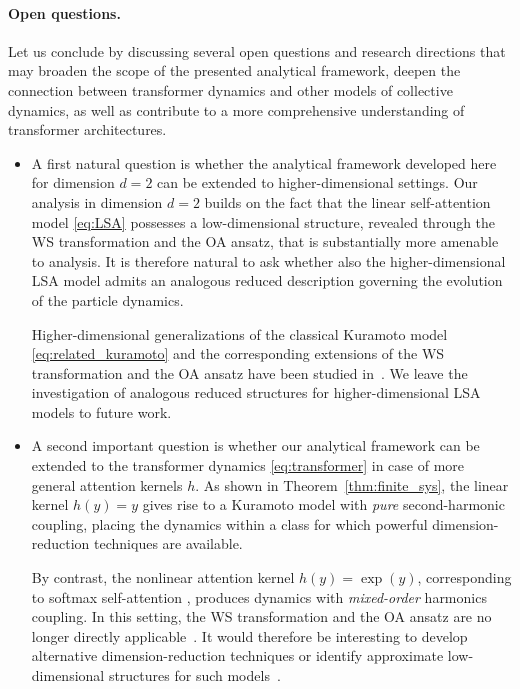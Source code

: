 \documentclass[10pt]{article}
\theoremstyle{definition}
\theoremstyle{definition}
\numberwithin{equation}{section}
\begin{document}


\paragraph{Open questions.}
Let us conclude by discussing several open questions and research directions that may broaden the scope of the presented analytical framework, deepen the connection between transformer dynamics and other models of collective dynamics, as well as contribute to a more comprehensive understanding of transformer architectures.
\begin{itemize}
    \item 
    A first natural question is whether the analytical framework developed here for dimension $d=2$ can be extended to higher-dimensional settings.
    Our analysis in dimension $d=2$ builds on the fact that the linear self-attention model \eqref{eq:LSA} possesses a low-dimensional structure, revealed through the WS transformation and the OA ansatz, that is substantially more amenable to analysis.
    It is therefore natural to ask whether also the higher-dimensional LSA model admits an analogous reduced description governing the evolution of the particle dynamics.
    
    Higher-dimensional generalizations of the classical Kuramoto model \eqref{eq:related_kuramoto} and the corresponding extensions of the WS transformation and the OA ansatz have been studied in~\cite{Lohe_2018,chandra2019complexity,Lipton_2021,park2022watanabe,lohe2025exact}.
    We leave the investigation of analogous reduced structures for higher-dimensional LSA models to future work.

    \item A second important question is whether our analytical framework can be extended to the transformer dynamics \eqref{eq:transformer} in case of more general attention kernels $h$.
    As shown in Theorem~\ref{thm:finite_sys}, the linear kernel $h(y) = y$ gives rise to a Kuramoto model with \emph{pure} second-harmonic coupling, placing the dynamics within a class for which powerful dimension-reduction techniques are available.
    
    By contrast, the nonlinear attention kernel $h(y) = \exp(y)$, corresponding to softmax self-attention \cite{vaswani2017attention}, produces dynamics with \emph{mixed-order} harmonics coupling.
    In this setting, the WS transformation and the OA ansatz are no longer directly applicable~\cite{Gong_2019}.
    It would therefore be interesting to develop alternative dimension-reduction techniques or identify approximate low-dimensional structures for such models~\cite{tonjes2020low,cestnik2022hierarchy,tokunaga2026low}.


\end{itemize}
\end{document}
